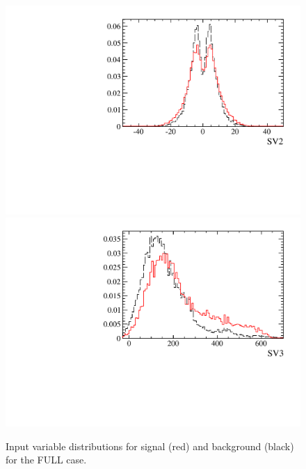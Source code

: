 \begin{figure} [htb!]
\begin{center}
\includegraphics[scale=0.20]{figs/SV2FULL.pdf}
\includegraphics[scale=0.20]{figs/SV3FULL.pdf}
\caption{Input variable distributions for signal (red) and background (black) for the FULL case. \label{fig:MVAhistos_FULL2}}
\end{center}
\end{figure}

